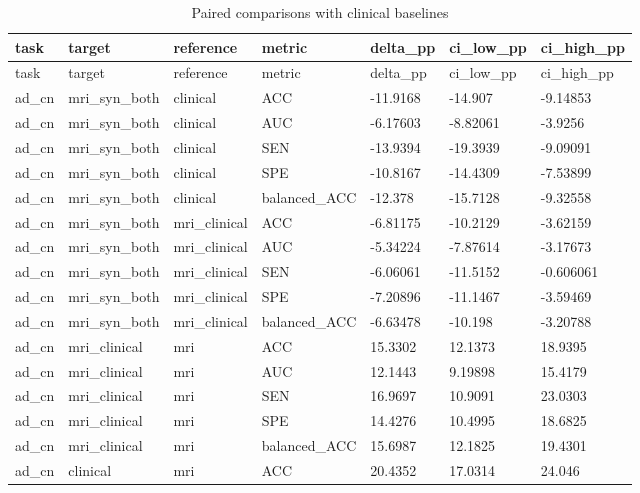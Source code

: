 \documentclass{article}
\begin{document}
\begin{landscape}
\begingroup
\footnotesize
\setlength{\tabcolsep}{4pt}
\begin{longtable}{lllllll}
\caption{Paired comparisons with clinical baselines}\label{tab:classification_clinical_comparisons}\\
\toprule
task & target & reference & metric & delta\_pp & ci\_low\_pp & ci\_high\_pp \\
\midrule
\endfirsthead
\toprule
task & target & reference & metric & delta\_pp & ci\_low\_pp & ci\_high\_pp \\
\midrule
\endhead
\bottomrule
\endfoot
ad\_cn & mri\_syn\_both & clinical & ACC & -11.9168 & -14.907 & -9.14853 \\
ad\_cn & mri\_syn\_both & clinical & AUC & -6.17603 & -8.82061 & -3.9256 \\
ad\_cn & mri\_syn\_both & clinical & SEN & -13.9394 & -19.3939 & -9.09091 \\
ad\_cn & mri\_syn\_both & clinical & SPE & -10.8167 & -14.4309 & -7.53899 \\
ad\_cn & mri\_syn\_both & clinical & balanced\_ACC & -12.378 & -15.7128 & -9.32558 \\
ad\_cn & mri\_syn\_both & mri\_clinical & ACC & -6.81175 & -10.2129 & -3.62159 \\
ad\_cn & mri\_syn\_both & mri\_clinical & AUC & -5.34224 & -7.87614 & -3.17673 \\
ad\_cn & mri\_syn\_both & mri\_clinical & SEN & -6.06061 & -11.5152 & -0.606061 \\
ad\_cn & mri\_syn\_both & mri\_clinical & SPE & -7.20896 & -11.1467 & -3.59469 \\
ad\_cn & mri\_syn\_both & mri\_clinical & balanced\_ACC & -6.63478 & -10.198 & -3.20788 \\
ad\_cn & mri\_clinical & mri & ACC & 15.3302 & 12.1373 & 18.9395 \\
ad\_cn & mri\_clinical & mri & AUC & 12.1443 & 9.19898 & 15.4179 \\
ad\_cn & mri\_clinical & mri & SEN & 16.9697 & 10.9091 & 23.0303 \\
ad\_cn & mri\_clinical & mri & SPE & 14.4276 & 10.4995 & 18.6825 \\
ad\_cn & mri\_clinical & mri & balanced\_ACC & 15.6987 & 12.1825 & 19.4301 \\
ad\_cn & clinical & mri & ACC & 20.4352 & 17.0314 & 24.046 \\

\end{longtable}
\end{landscape}
\end{document}
